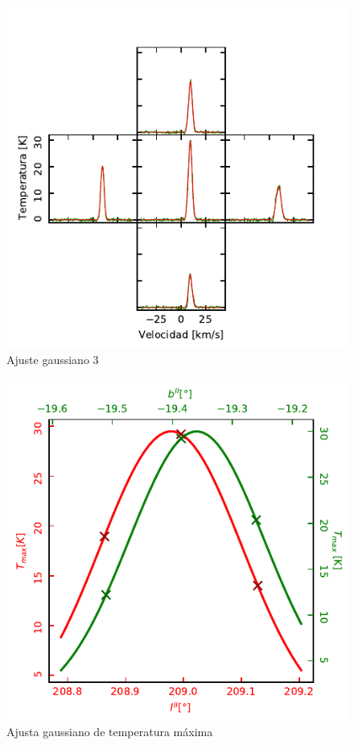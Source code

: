 \begin{figure}[htbp]
	\centering
	\includegraphics{specfit3.pdf}
	\caption{Ajuste gaussiano 3}
	\label{fig:specfit3}
\end{figure}

\begin{figure}[htbp]
	\centering
	\includegraphics{tmax.pdf}
	\caption{Ajusta gaussiano de temperatura máxima}
	\label{fig:tmax}
\end{figure}


